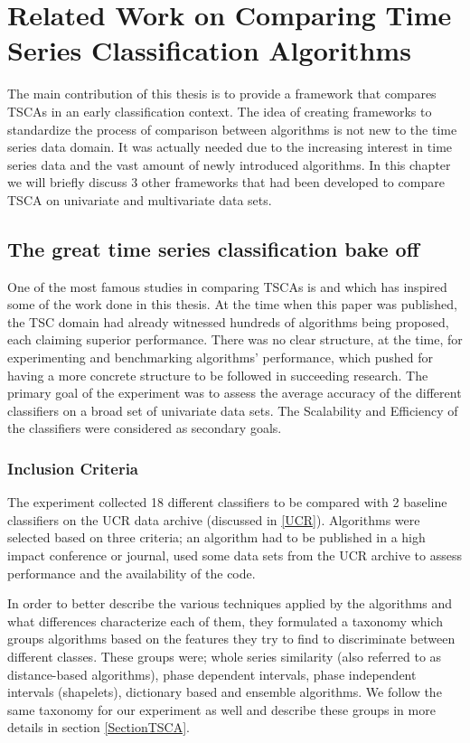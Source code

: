 \chapter{Related Work on Comparing Time Series Classification Algorithms}
\label{ChapterRelatedWork}
The main contribution of this thesis is to provide a framework that compares TSCAs in an early classification context.
The idea of creating frameworks to standardize the process of comparison between algorithms is not new to the time series data domain.
It was actually needed due to the increasing interest in time series data and the vast amount of newly introduced algorithms.
In this chapter we will briefly discuss 3 other frameworks that had been developed to compare TSCA on univariate and multivariate data sets.

\section{The great time series classification bake off}
\label{GreatBakeoffUnivariate}
One of the most famous studies in comparing TSCAs is \cite{bagnall2017great} and which has inspired some of the work done in this thesis.
At the time when this paper was published, the TSC domain had already witnessed hundreds of algorithms being proposed, each claiming superior performance.
There was no clear structure, at the time, for experimenting and benchmarking algorithms' performance, which pushed for having a more concrete structure to be followed in succeeding research.
The primary goal of the experiment was to assess the average accuracy of the different classifiers on a broad set of univariate data sets.
The Scalability and Efficiency of the classifiers were considered as secondary goals.

\subsection{Inclusion Criteria}
\label{subsectionUniBakeoffInclusion}
The experiment collected 18 different classifiers to be compared with 2 baseline classifiers on the UCR data archive (discussed in \ref{UCR}).
Algorithms were selected based on three criteria; an algorithm had to be published in a high impact conference or journal, used some data sets from the UCR archive to assess performance
and the availability of the code.

In order to better describe the various techniques applied by the algorithms and what differences characterize each of them, they formulated a taxonomy which 
groups algorithms based on the features they try to find to discriminate between different classes.
These groups were; whole series similarity (also referred to as distance-based algorithms), phase dependent intervals, phase independent intervals (shapelets), dictionary based and ensemble algorithms.
We follow the same taxonomy for our experiment as well and describe these groups in more details in section \ref{SectionTSCA}.

